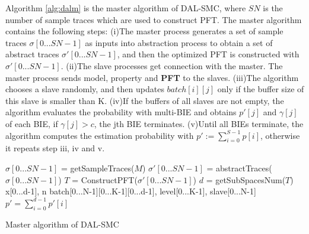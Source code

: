 Algorithm \ref{alg:dalm} is the master algorithm of DAL-SMC, where $SN$ is the number of sample traces which are used to construct PFT. The master algorithm contains the following steps: (i)The master process generates a set of sample traces $\sigma[0...SN-1]$ as inputs into abstraction process to obtain a set of abstract traces $\sigma'[0...SN-1]$, and then the optimized PFT is constructed with $\sigma'[0...SN-1]$. (ii)The slave processes get connection with the master. The master process sends model, property and \textbf{PFT} to the slaves. (iii)The algorithm chooses a slave randomly, and then updates $batch[i][j]$ only if the buffer size of this slave is smaller than K. (iv)If the buffers of all slaves are not empty, the algorithm evaluates the probability with multi-BIE and obtains $p'[j]$ and $\gamma[j]$ of each BIE, if $\gamma[j] > c$, the jth BIE terminates. (v)Until all BIEs terminate, the algorithm computes the estimation probability with $p' := \sum\limits_{i=0}^{S-1} p[i]$, otherwise it repeats step iii, iv and v.

\begin{algorithm}[t]
{}
$\sigma[0...SN-1]$ = getSampleTraces($M$)\;
$\sigma'[0...SN-1]$ = abstractTraces($\sigma[0...SN-1]$)\;
$T$ = ConstructPFT($\sigma'[0...SN-1]$)\;
$d$ = getSubSpacesNum($T$)\;
x[0...d-1], n\;
batch[0...N-1][0...K-1][0...d-1], level[0...K-1], slave[0...N-1]\;
 $p' = \sum\limits_{i=0}^{d-1} p'[i]$\;
\caption{Master algorithm of DAL-SMC}
\label{alg:dalm}
\end{algorithm}

